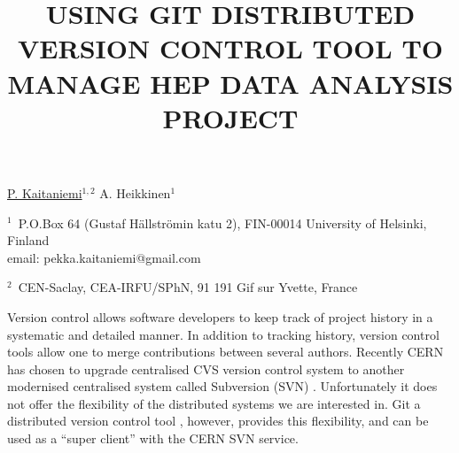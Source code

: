 \documentclass[12pt]{article}
\begin{document}
\title{USING GIT DISTRIBUTED VERSION CONTROL TOOL TO MANAGE HEP DATA ANALYSIS PROJECT}
\underline{P. Kaitaniemi}$^{1, 2}$ A. Heikkinen$^1$ 

$^1$~P.O.Box 64 (Gustaf H\"allstr\"omin katu 2), FIN-00014 University of Helsinki, Finland\\
email: pekka.kaitaniemi@gmail.com

$^2$~CEN-Saclay, CEA-IRFU/SPhN, 91 191 Gif sur Yvette, France
\vspace{\baselineskip}

Version control allows software developers to keep track of project history in
a systematic and detailed manner. 
In addition to tracking history, version control tools allow
one to merge contributions between several authors.
Recently CERN has chosen to upgrade centralised CVS version control
system to another modernised centralised system called Subversion (SVN) \cite{svnsite}.
Unfortunately it does not offer the flexibility of the
distributed systems we are interested in. 
Git a distributed version control tool \cite{torvalds}, however, 
provides this flexibility, 
and can be used as a ``super client'' with the CERN SVN service.

\end{document}
